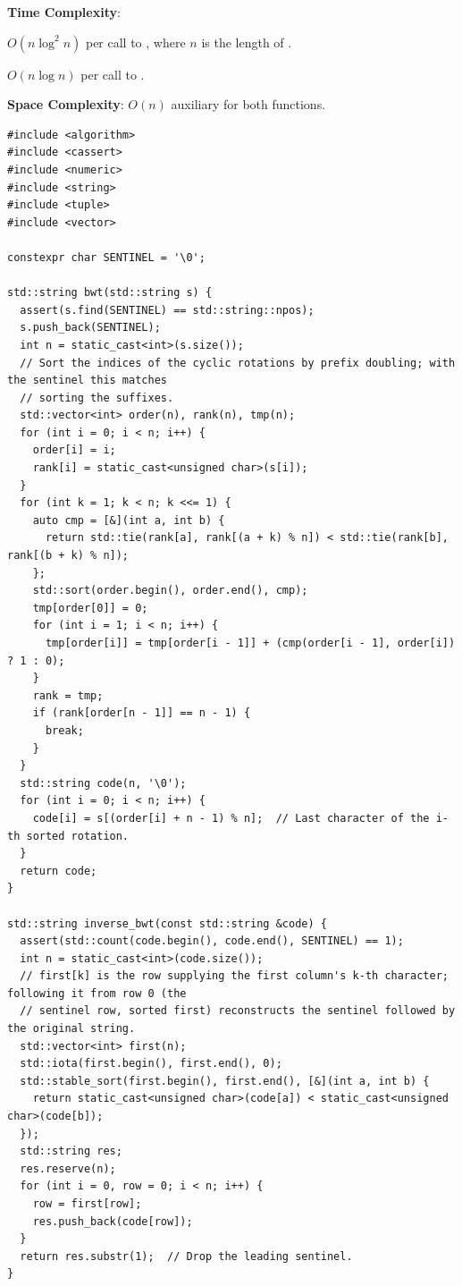 \textbf{Time Complexity}:
\begin{compactitem}
  \item $O(n \log^{2} n)$ per call to , where $n$ is the length of .
  \item $O(n \log n)$ per call to .
\end{compactitem}

\textbf{Space Complexity}: $O(n)$ auxiliary for both functions.

\begin{lstlisting}[style=cpp]
#include <algorithm>
#include <cassert>
#include <numeric>
#include <string>
#include <tuple>
#include <vector>

constexpr char SENTINEL = '\0';

std::string bwt(std::string s) {
  assert(s.find(SENTINEL) == std::string::npos);
  s.push_back(SENTINEL);
  int n = static_cast<int>(s.size());
  // Sort the indices of the cyclic rotations by prefix doubling; with the sentinel this matches
  // sorting the suffixes.
  std::vector<int> order(n), rank(n), tmp(n);
  for (int i = 0; i < n; i++) {
    order[i] = i;
    rank[i] = static_cast<unsigned char>(s[i]);
  }
  for (int k = 1; k < n; k <<= 1) {
    auto cmp = [&](int a, int b) {
      return std::tie(rank[a], rank[(a + k) % n]) < std::tie(rank[b], rank[(b + k) % n]);
    };
    std::sort(order.begin(), order.end(), cmp);
    tmp[order[0]] = 0;
    for (int i = 1; i < n; i++) {
      tmp[order[i]] = tmp[order[i - 1]] + (cmp(order[i - 1], order[i]) ? 1 : 0);
    }
    rank = tmp;
    if (rank[order[n - 1]] == n - 1) {
      break;
    }
  }
  std::string code(n, '\0');
  for (int i = 0; i < n; i++) {
    code[i] = s[(order[i] + n - 1) % n];  // Last character of the i-th sorted rotation.
  }
  return code;
}

std::string inverse_bwt(const std::string &code) {
  assert(std::count(code.begin(), code.end(), SENTINEL) == 1);
  int n = static_cast<int>(code.size());
  // first[k] is the row supplying the first column's k-th character; following it from row 0 (the
  // sentinel row, sorted first) reconstructs the sentinel followed by the original string.
  std::vector<int> first(n);
  std::iota(first.begin(), first.end(), 0);
  std::stable_sort(first.begin(), first.end(), [&](int a, int b) {
    return static_cast<unsigned char>(code[a]) < static_cast<unsigned char>(code[b]);
  });
  std::string res;
  res.reserve(n);
  for (int i = 0, row = 0; i < n; i++) {
    row = first[row];
    res.push_back(code[row]);
  }
  return res.substr(1);  // Drop the leading sentinel.
}
\end{lstlisting}
